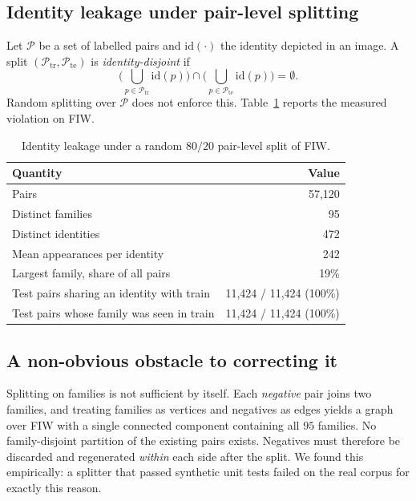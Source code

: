 \documentclass[journal,12pt]{IEEEtran}
\begin{document}
\subsection{Identity leakage under pair-level splitting}

Let $\mathcal{P}$ be a set of labelled pairs and $\mathrm{id}(\cdot)$ the
identity depicted in an image. A split $(\mathcal{P}_{\text{tr}},
\mathcal{P}_{\text{te}})$ is \emph{identity-disjoint} if
\begin{equation}
\Big(\bigcup_{p \in \mathcal{P}_{\text{tr}}} \mathrm{id}(p)\Big) \cap
\Big(\bigcup_{p \in \mathcal{P}_{\text{te}}} \mathrm{id}(p)\Big) = \emptyset .
\end{equation}
Random splitting over $\mathcal{P}$ does not enforce this. Table~\ref{tab:leak}
reports the measured violation on FIW.

\begin{table}[t]
\caption{Identity leakage under a random $80/20$ pair-level split of FIW.}
\label{tab:leak}
\centering
\small
\begin{tabular}{@{}lr@{}}
\toprule
Quantity & Value \\
\midrule
Pairs & 57{,}120 \\
Distinct families & 95 \\
Distinct identities & 472 \\
Mean appearances per identity & 242 \\
Largest family, share of all pairs & 19\% \\
\midrule
Test pairs sharing an identity with train & 11{,}424 / 11{,}424 (100\%) \\
Test pairs whose family was seen in train & 11{,}424 / 11{,}424 (100\%) \\
\bottomrule
\end{tabular}
\end{table}

\subsection{A non-obvious obstacle to correcting it}

Splitting on families is not sufficient by itself. Each \emph{negative} pair
joins two families, and treating families as vertices and negatives as edges
yields a graph over FIW with a single connected component containing all $95$
families. No family-disjoint partition of the existing pairs exists. Negatives
must therefore be discarded and regenerated \emph{within} each side after the
split. We found this empirically: a splitter that passed synthetic unit tests
failed on the real corpus for exactly this reason.
\end{document}
